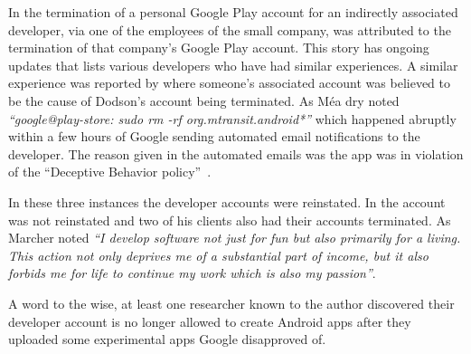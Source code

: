 In \textcite{martinez2019_google_just_terminated_our_startup_google_play_publisher_account_on_xmas_day} the termination of a personal Google Play account for an indirectly associated developer, via one of the employees of the small company, was attributed to the termination of that company's Google Play account. This story has ongoing updates that lists various developers who have had similar experiences. A similar experience was reported by \textcite{dodson2019_google_completely_terminated_our_new_business_etc} where someone's associated account was believed to be the cause of Dodson's account being terminated. As Méa dry noted \emph{``google@play-store: sudo rm -rf org.mtransit.android*''} which happened abruptly within a few hours of Google sending automated email notifications to the developer. The reason given in the automated emails was the app was in violation of the ``Deceptive Behavior policy''~. 

In these three instances the developer accounts were reinstated. In \textcite{marcher2021_how_google_terminated-a-developer} the account was not reinstated and two of his clients also had their accounts terminated. As Marcher noted \emph{``I develop software not just for fun but also primarily for a living. This action not only deprives me of a substantial part of income, but it also forbids me for life to continue my work which is also my passion''}. %

A word to the wise, at least one researcher known to the author discovered their developer account is no longer allowed to create Android apps after they uploaded some experimental apps Google disapproved of.

